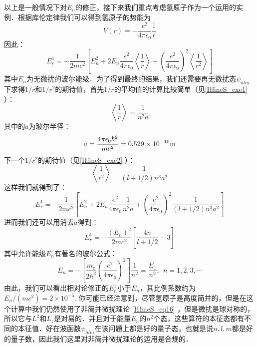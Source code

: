 以上是一般情况下对$E_n$的修正，接下来我们重点考虑氢原子作为一个运用的实例．根据库伦定律我们可以得到氢原子的势能为
\begin{equation}
V(r)=-\frac{e^2}{4\pi\epsilon_0}\frac{1}{r}
\end{equation}
因此：
\begin{equation}
E_r^1=-\frac{1}{2mc^2}\left[E_n^2+2E_n\frac{e^2}{4\pi\epsilon_0}\left\langle \frac{1}{r}\right\rangle+\left(\frac{e^2}{4\pi\epsilon_0}\right)^2\left\langle \frac{1}{r^2}\right\rangle\right]
\end{equation}
其中$E_n$为无微扰的波尔能级．为了得到最终的结果，我们还需要再无微扰态$\psi_{nlm}$下求得$1/r$和$1/r^2$的期待值，首先$1/r$的平均值的计算比较简单（见\autoref{HfineS_exe1} ）：
\begin{equation}
\left\langle\frac{1}{r}\right\rangle = \frac{1}{n^2a}
\end{equation}
其中的$a$为玻尔半径：
\begin{equation}
a=\frac{4\pi\epsilon_0\hbar^2}{me^2}=0.529\times 10^{-10}\rm{m}
\end{equation}
下一个$1/r^2$的期待值（见\autoref{HfineS_exe2} ）：
\begin{equation}
\left\langle \frac{1}{r^2}\right\rangle = \frac{1}{(l+1/2)n^3a^2}
\end{equation}
这样我们就得到了：
\begin{equation}
E_r^1=-\frac{1}{2mc^2}\left[E_n^2+2E_n\frac{e^2}{4\pi\epsilon_0}\frac{1}{n^2a}+\left(\frac{e^2}{4\pi\epsilon_0}\right)^2\frac{1}{(l+1/2)n^3a^2}\right]
\end{equation}
进而我们还可以用消去$a$得到：
\begin{equation}\label{HfineS_eq21}
E_r^1=-\frac{(E_n)^2}{2mc^2}\left[\frac{4n}{l+1/2}-3\right]
\end{equation}
其中允许能级$E_n$有著名的玻尔公式：
\begin{equation}
E_{n} =-\left[\frac {m_e}{2\hbar^{2}} \left(\frac {e^ {2}}{4\pi \epsilon_0}\right)^ {2}\right]  \frac {1}{n^ {2}}  =  \frac {E_ {1}}{n^ {2}}, \ \  n=1,2,3, \cdots 
\end{equation}
由此，我们可以看出相对论修正的$E^1_n$小于$E_n$，其比例系数约为$E_n/(mc^2)=2\times 10^{-5}$.
你可能已经注意到，尽管氢原子是高度简并的，但是在这个计算中我们仍然使用了非简并微扰理论 \autoref{HfineS_eq16} ，但是微扰是球对称的，所以它与$L^2$和$L_z$是对易的．并且对于能量$E_n$的$n^2$个态，这些算符的本征态都有不同的本征值．好在波函数$\psi_{nlm}$在该问题上都是好的量子态，也就是说$n,l,m$都是好的量子数，因此我们这里对非简并微扰理论的运用是合规的．


